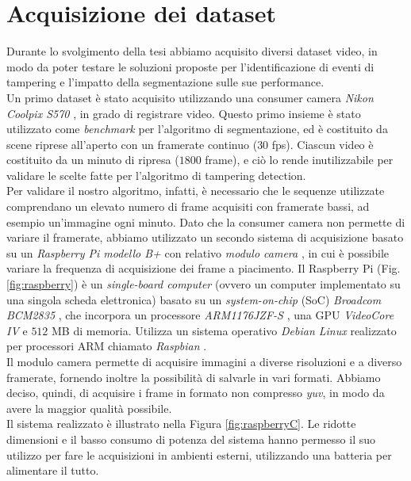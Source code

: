 \section{Acquisizione dei dataset}
\label{acquisizione}
Durante lo svolgimento della tesi abbiamo acquisito diversi dataset video, in modo da poter testare le soluzioni proposte per l'identificazione di eventi di tampering e l'impatto della segmentazione sulle sue performance.\\
Un primo dataset \`e stato acquisito utilizzando una consumer camera \textit{Nikon Coolpix S570} \cite{nikon}, in grado di registrare video.
Questo primo insieme \`e stato utilizzato come \textit{benchmark} per l'algoritmo di segmentazione, ed \`e costituito da scene riprese all'aperto con un framerate continuo ($30$ fps).
Ciascun video \`e costituito da un minuto di ripresa ($1800$ frame), e ci\`o lo rende inutilizzabile per validare le scelte fatte per l'algoritmo di tampering detection.\\
Per validare il nostro algoritmo, infatti, \`e necessario che le sequenze utilizzate comprendano un elevato numero di frame acquisiti con framerate bassi, ad esempio un'immagine ogni minuto. 
Dato che la consumer camera non permette di variare il framerate, abbiamo utilizzato un secondo sistema di acquisizione basato su un \textit{Raspberry Pi modello B+} \cite{raspberry} con relativo \textit{modulo camera} \cite{raspberryCamera}, in cui \`e possibile variare la frequenza di acquisizione dei frame a piacimento.
Il Raspberry Pi (Fig. \ref{fig:raspberry}) \`e un \textit{single-board computer} (ovvero un computer implementato su una singola scheda elettronica) basato su un \textit{system-on-chip} (SoC) \textit{Broadcom BCM2835} \cite{broadcom}, che incorpora un processore \textit{ARM1176JZF-S} \cite{arm}, una GPU \textit{VideoCore IV} \cite{gpu} e $512$ MB di memoria.
Utilizza un sistema operativo \textit{Debian Linux} realizzato per processori ARM chiamato \textit{Raspbian} \cite{raspbian}.\\
Il modulo camera permette di acquisire immagini a diverse risoluzioni e a diverso framerate, fornendo inoltre la possibilit\`a di salvarle in vari formati.
Abbiamo deciso, quindi, di acquisire i frame in formato non compresso \textit{yuv}, in modo da avere la maggior qualit\`a possibile.\\
Il sistema realizzato \`e illustrato nella Figura \ref{fig:raspberryC}. Le ridotte dimensioni e il basso consumo di potenza del sistema hanno permesso il suo utilizzo per fare le acquisizioni in ambienti esterni, utilizzando una batteria per alimentare il tutto. 
